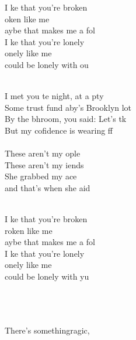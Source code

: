 \begin{cancion}[Broken][lovelytheband]%
	\begin{chorus}%
	I ke that you're broken\\
	oken like me\\
	aybe that makes me a fol\\
	I ke that you're lonely\\
	onely like me\\
	 could be lonely with ou\\
	\end{chorus}%
	\jump\\
	I met you te night, at a pty\\
	Some trust fund aby's Brooklyn lot\\
	By the bhroom, you said: Let's tk\\
	But my cofidence is wearing ff\\
\jump\\
	These aren't my ople\\
	These aren't my iends\\
	She grabbed my ace \\
	and that's when she aid\\\jump\\
	\begin{chorus}%
	I ke that you're broken\\
	roken like me\\
	aybe that makes me a fol\\
	I ke that you're lonely\\
	onely like me\\
	 could be lonely with yu\\
	\end{chorus}%
	\jump\\
{}\vspace*{-0.4cm}\\
	      \\
	There’s somethingragic, \\

\end{cancion}
